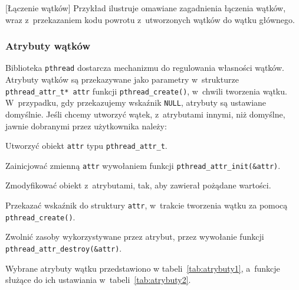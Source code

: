 \begin{example}{[Łączenie wątków]}
Przykład ilustruje omawiane zagadnienia łączenia wątków, wraz z~przekazaniem kodu powrotu z~utworzonych wątków do wątku głównego.



\end{example}


\subsubsection{Atrybuty wątków}

Biblioteka \lstinline[style=MyCStyle]{pthread} dostarcza mechanizmu do regulowania własności wątków. Atrybuty wątków są przekazywane jako parametry w~strukturze \lstinline[style=MyCStyle]{pthread_attr_t* attr} funkcji \lstinline[style=MyCStyle]{pthread_create()}, w~chwili tworzenia wątku. W~przypadku, gdy przekazujemy wskaźnik \lstinline[style=MyCStyle]{NULL}, atrybuty są ustawiane domyślnie. Jeśli chcemy utworzyć wątek, z~atrybutami innymi, niż domyślne, jawnie dobranymi przez użytkownika należy:


\begin{myitemize}
\item Utworzyć obiekt \lstinline[style=MyCStyle]{attr} typu \lstinline[style=MyCStyle]{pthread_attr_t}.
\item Zainicjować zmienną \lstinline[style=MyCStyle]{attr} wywołaniem funkcji \lstinline[style=MyCStyle]{pthread_attr_init(&attr)}.
\item Zmodyfikować obiekt z~atrybutami, tak, aby zawierał pożądane wartości.
\item Przekazać wskaźnik do struktury \lstinline[style=MyCStyle]{attr}, w~trakcie tworzenia wątku za pomocą \lstinline[style=MyCStyle]{pthread_create()}.
\item Zwolnić zasoby wykorzystywane przez atrybut, przez wywołanie funkcji \mbox{\lstinline[style=MyCStyle]{pthread_attr_destroy(&attr)}}.
\end{myitemize}

Wybrane atrybuty wątku przedstawiono w tabeli~\ref{tab:atrybuty1}, a~funkcje służące do ich ustawiania w~tabeli~\ref{tab:atrybuty2}.

